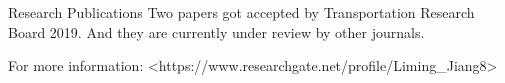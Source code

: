 



\begin{rubric}{Research Publications}
%
\entry*[since 2018]%
Two papers got accepted by Transportation Research Board 2019. And they are currently under review by other journals. 

For more information: <https://www.researchgate.net/profile/Liming\_Jiang8>
%
%
%
\end{rubric}
